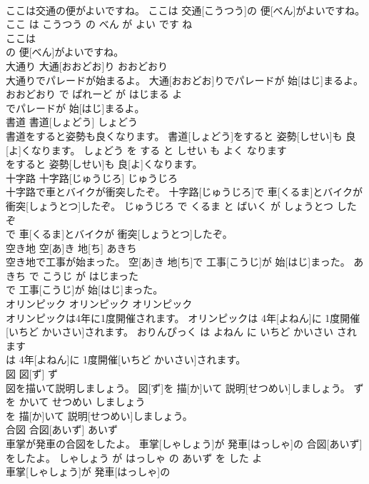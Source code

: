 \documentclass[8pt]{extreport}
\begin{document}
\begin{CJK}{UTF8}{min}
\\	ここは交通の便がよいですね。	ここは 交通[こうつう]の 便[べん]がよいですね。	ここ は こうつう の べん が よい です ね	
\\	ここは
\\	の 便[べん]がよいですね。			
\\	大通り	大通[おおどお]り	おおどおり	
\\	大通りでパレードが始まるよ。	大通[おおどお]りでパレードが 始[はじ]まるよ。	おおどおり で ぱれーど が はじまる よ	
\\	でパレードが 始[はじ]まるよ。			
\\	書道	書道[しょどう]	しょどう	
\\	書道をすると姿勢も良くなります。	書道[しょどう]をすると 姿勢[しせい]も 良[よ]くなります。	しょどう を する と しせい も よく なります	
\\	をすると 姿勢[しせい]も 良[よ]くなります。			
\\	十字路	十字路[じゅうじろ]	じゅうじろ	
\\	十字路で車とバイクが衝突したぞ。	十字路[じゅうじろ]で 車[くるま]とバイクが 衝突[しょうとつ]したぞ。	じゅうじろ で くるま と ばいく が しょうとつ した ぞ	
\\	で 車[くるま]とバイクが 衝突[しょうとつ]したぞ。			
\\	空き地	空[あ]き 地[ち]	あきち	
\\	空き地で工事が始まった。	空[あ]き 地[ち]で 工事[こうじ]が 始[はじ]まった。	あきち で こうじ が はじまった	
\\	で 工事[こうじ]が 始[はじ]まった。			
\\	オリンピック	オリンピック	オリンピック	
\\	オリンピックは4年に1度開催されます。	オリンピックは 4年[よねん]に 1度開催[いちど かいさい]されます。	おりんぴっく は よねん に いちど かいさい されます	
\\	は 4年[よねん]に 1度開催[いちど かいさい]されます。			
\\	図	図[ず]	ず	
\\	図を描いて説明しましょう。	図[ず]を 描[か]いて 説明[せつめい]しましょう。	ず を かいて せつめい しましょう	
\\	を 描[か]いて 説明[せつめい]しましょう。			
\\	合図	合図[あいず]	あいず	
\\	車掌が発車の合図をしたよ。	車掌[しゃしょう]が 発車[はっしゃ]の 合図[あいず]をしたよ。	しゃしょう が はっしゃ の あいず を した よ	
\\	車掌[しゃしょう]が 発車[はっしゃ]の

\end{CJK}
\end{document}
